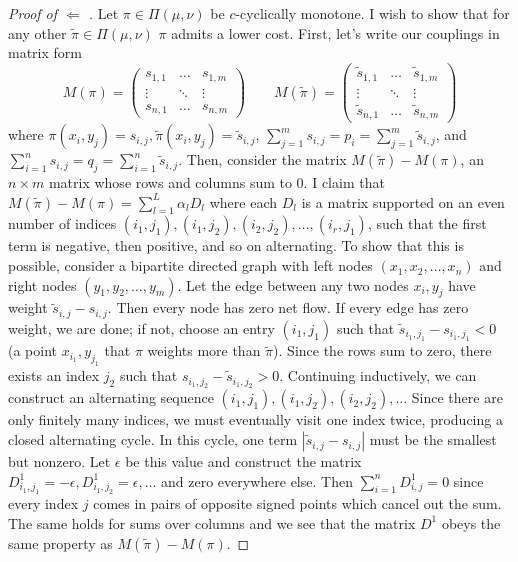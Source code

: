 \documentclass[11pt]{amsart}
\theoremstyle{definition}                  %
\theoremstyle{remark}                      %
\begin{document}
\begin{proof}[Proof of $\Leftarrow$ ]
    Let $\pi \in \Pi(\mu,\nu)$ be $c$-cyclically monotone. I wish to show that for any other $\tilde \pi \in \Pi(\mu,\nu)$ 
    $ \pi$ admits a lower cost. First, let's write our couplings in matrix form
    \[
    M(\pi) = 
    \begin{pmatrix} s_{1,1} & \dots & s_{1,m} \\ \vdots & \ddots & \vdots \\ s_{n,1} & \dots & s_{n,m} \end{pmatrix} 
    \qquad 
    M(\tilde \pi) =
    \begin{pmatrix} \tilde s_{1,1} & \dots & \tilde s_{1,m} \\ \vdots & \ddots & \vdots \\ \tilde s_{n,1} & \dots & \tilde s_{n,m} \end{pmatrix} 
    \] 
    where $ \pi(x_i,y_j) = s_{i,j}, \tilde \pi(x_i,y_j) = \tilde s_{i,j}$, $ \sum_{j=1}^{m}s_{i,j} = p_i = \sum_{j=1}^{m}\tilde s_{i,j}$, and $   \sum _{i=1}^{n}s_{i,j} = q_j = \sum_{i=1}^{n}\tilde s_{i,j} $.
    Then, consider the matrix $M(\tilde \pi) - M(\pi)$, an $n \times m$ matrix whose rows and columns sum to 0.
    I claim that $M(\tilde \pi) - M(\pi) = \sum_{l=1}^{L}\alpha_lD_l$ where each $D_l$ 
    is a matrix supported on an even number of indices  $(i_1,j_1), (i_1,j_2),(i_2,j_2),\dots,(i_r,j_1)$, such that
    the first term is negative, then positive, and so on alternating. 
    To show that this is possible, consider a bipartite directed graph with left nodes $(x_1,x_2,\dots,x_n)$ and right nodes $(y_1,y_2,\dots,y_m)$. Let the edge between
    any two nodes $x_i,y_j$ have weight  $\tilde s_{i,j} - s_{i,j}$. Then every node has zero net flow. If every edge has zero weight, we are done; if not, choose an entry  $(i_1,j_1)$ such that
    $\tilde s_{i_1,j_1} - s_{i_1,j_1} < 0$ (a point $x_{i_1},y_{j_1}$ that $\pi$ weights more than $\tilde \pi$). Since the rows sum to zero, there exists an index $j_2$ such that $s_{i_1,j_2} - \tilde s_{i_1,j_2} > 0$. Continuing inductively,
    we can construct an alternating sequence $(i_1,j_1),(i_1,j_2),(i_2,j_2),\dots$
    Since there are only finitely many indices, we must eventually visit one index twice, producing a closed alternating cycle. In this cycle, one term $|\tilde s_{i,j} - s_{i,j}|$ must be the smallest but nonzero. 
    Let $\epsilon$ be this value and construct the matrix $D^{1}_{i_1,j_1} = -\epsilon, D^{1}_{i_1,j_2} = \epsilon, \dots$ and zero everywhere else.
    Then $\sum_{i=1}^{n}D^{1}_{i,j} = 0$ since every index $j$ comes in pairs of opposite signed points which cancel out the sum. The same holds for sums over columns and we see that the matrix $D^{1}$ obeys the same property as $M(\tilde \pi) - M(\pi)$.

\end{proof}
\end{document}
